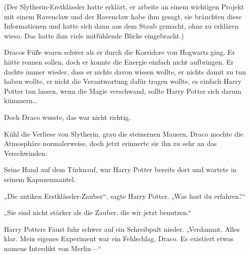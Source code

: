 (Der Slytherin-Erstklässler hatte erklärt, er arbeite an einem wichtigen Projekt mit einem Ravenclaw und der Ravenclaw habe ihm gesagt, sie bräuchten diese Informationen und hatte sich dann aus dem Staub gemacht, ohne zu erklären wieso. Das hatte ihm viele mitfühlende Blicke eingebracht.)

Dracos Füße waren schwer als er durch die Korridore von Hogwarts ging. Er hätte rennen sollen, doch er konnte die Energie einfach nicht aufbringen. Er dachte immer wieder, dass er nichts davon wissen wollte, er nichts damit zu tun haben wollte, er nicht die Verantwortung dafür tragen wollte, es einfach Harry Potter tun lassen, wenn die Magie verschwand, sollte Harry Potter sich darum kümmern…

Doch Draco wusste, das war nicht richtig.

Kühl die Verliese von Slytherin, grau die steinernen Mauern, Draco mochte die Atmosphäre normalerweise, doch jetzt erinnerte sie ihn zu sehr an das Verschwinden.

Seine Hand auf dem Türknauf, war Harry Potter bereits dort und wartete in seinem Kapuzenmantel.

„Die antiken Erstklässler-Zauber“, sagte Harry Potter. „Was hast du erfahren?“

„Sie sind nicht stärker als die Zauber, die wir jetzt benutzen.“

Harry Potters Faust fuhr schwer auf ein Schreibpult nieder. „Verdammt. Alles klar. Mein eigenes Experiment war ein Fehlschlag, Draco. Es existiert etwas namens Interdikt von Merlin—“

